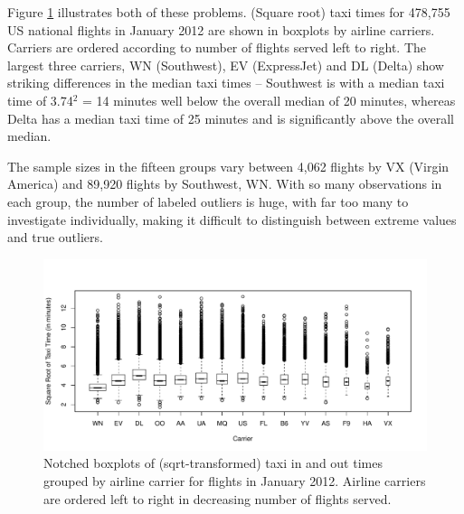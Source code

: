\documentclass[12pt,oneside]{article}
\begin{document}
Figure \ref{fig:taxi-bp} illustrates both of these problems.  (Square root) taxi times  for 478,755 US national flights in January 2012 are shown in boxplots by airline carriers.  Carriers are ordered according to number of flights served left to right. The largest three carriers, WN (Southwest), EV (ExpressJet)  and DL (Delta) show striking differences in the median taxi times -- Southwest is with a median taxi time of 3.74$^2$ = 14 minutes well below the overall median of 20 minutes, whereas Delta has a median taxi time of 25 minutes and is significantly above the overall median.

The sample sizes in the fifteen groups vary between 4,062 flights by VX (Virgin America) and 89,920 flights by Southwest, WN. 
With so many
observations in each group, the number of labeled outliers is huge, with
far too many to investigate individually, making it difficult to distinguish
between extreme values and true outliers.

%
%

\begin{figure}[hbtp]
  \centering
  \includegraphics[width=\linewidth]{taxi-bp}

  \caption{Notched boxplots \citep{variations.boxplots} of (sqrt-transformed)
  taxi in and out times grouped by airline carrier for flights in January 2012. Airline carriers are ordered left to right in decreasing  number of flights served. }

  \label{fig:taxi-bp} 
\end{figure}
\end{document}
